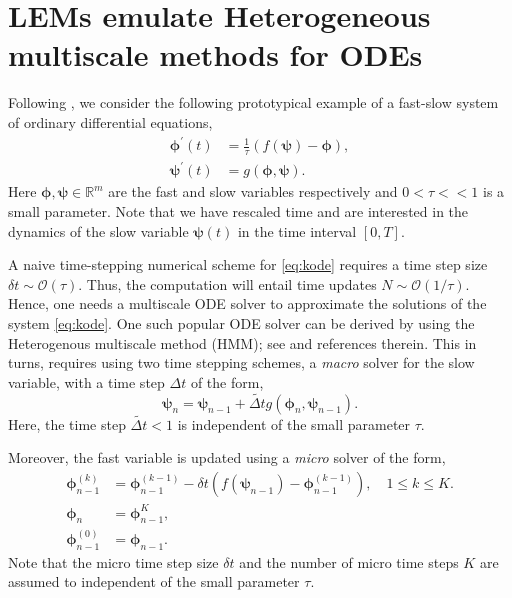 \documentclass{article} \usepackage{iclr2022_conference,times}
\newcommand{\bc}{{\boldsymbol{\psi}}}
\newcommand{\bh}{{\boldsymbol{\phi}}}
\newcommand{\ord}{{\mathcal O}}
\newcommand{\R}{{\mathbb R}}
\newcommand{\Dt}{{\Delta t}}
\begin{document}
\section{LEMs emulate Heterogeneous multiscale methods for ODEs}
\label{app:hmm}
Following \cite{Kuhn_book}, we consider the following prototypical example of a fast-slow system of ordinary differential equations, 
\begin{equation}
    \label{eq:kode}
    \begin{aligned}
    \bh^{\prime}(t) &= \frac{1}{\tau}\left(f(\bc) - \bh\right), \\
    \bc^{\prime}(t) &= g(\bh,\bc).
    \end{aligned}
\end{equation}
Here $\bh,\bc \in \R^m$ are the fast and slow variables respectively and $0 < \tau << 1$ is a small parameter. Note that we have rescaled time and are interested in the dynamics of the slow variable $\bc(t)$ in the time interval $[0,T]$. 

A naive time-stepping numerical scheme for \eqref{eq:kode} requires a time step size $\delta t \sim \ord(\tau)$. Thus, the computation will entail time updates $N \sim \ord(1/\tau)$. Hence, one needs a multiscale ODE solver to approximate the solutions of the system \eqref{eq:kode}. One such popular ODE solver can be derived by using the Heterogenous multiscale method (HMM); see \citet{Kuhn_book} and references therein. This in turns, requires using two time stepping schemes, a \emph{macro} solver for the slow variable, with a time step $\Dt$ of the form,
\begin{equation}
    \label{eq:hmm1}
    \bc_n = \bc_{n-1} + \tilde{\Dt} g(\bh_n,\bc_{n-1}).
\end{equation}
Here, the time step $\tilde{\Dt} < 1$ is independent of the small parameter $\tau$. 

Moreover, the fast variable is updated using a \emph{micro} solver of the form,
\begin{equation}
    \label{eq:hmm2}
    \begin{aligned}
    \bh^{(k)}_{n-1} &= \bh^{(k-1)}_{n-1} - \delta t (f(\bc_{n-1}) - \bh^{(k-1)}_{n-1}), \quad 1 \leq k \leq K.\\
    \bh_n &= \bh^K_{n-1}, \\
    \bh^{(0)}_{n-1} &= \bh_{n-1}.
    \end{aligned}
\end{equation}
Note that the micro time step size $\delta t$ and the number of micro time steps $K$ are assumed to independent of the small parameter $\tau$.
\end{document}
